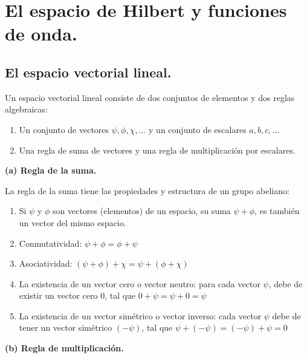 \section{El espacio de Hilbert y funciones de onda.}

\subsection{El espacio vectorial lineal.}

Un espacio vectorial lineal consiste de dos conjuntos de elementos y dos reglas algebraicas:
\begin{enumerate}
\item Un conjunto de vectores $\psi, \phi, \chi, \ldots$ y un conjunto de escalares $a, b, c, \ldots$
\item Una regla de suma de vectores y una regla de multiplicación por escalares.
\end{enumerate}
\textbf{(a) Regla de la suma.}

La regla de la suma tiene las propiedades y estructura de un grupo abeliano:
\begin{enumerate}
\item Si $\psi$ y $\phi$ son vectores (elementos) de un espacio, su suma $\psi + \phi$, es también un vector del mismo espacio.
\item Conmutatividad: $\psi + \phi = \phi + \psi$
\item Asociatividad: $(\psi + \phi) + \chi = \psi + (\phi + \chi)$
\item La existencia de un vector cero o vector neutro: para cada vector $\psi$, debe de existir un vector cero $0$, tal que $0 + \psi = \psi + 0 = \psi$
\item La existencia de un vector simétrico o vector inverso: cada vector $\psi$ debe de tener un vector simétrico $(-\psi)$, tal que $\psi + (-\psi) = (-\psi) + \psi = 0$
\end{enumerate}
\textbf{(b) Regla de multiplicación.}

